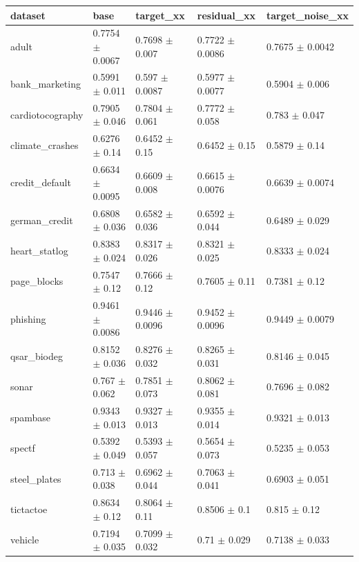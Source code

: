 \begin{tabular}{lllll}
\toprule
dataset & base & target\_xx & residual\_xx & target\_noise\_xx \\
\midrule
adult & 0.7754 $\pm$ 0.0067 & 0.7698 $\pm$ 0.007 & 0.7722 $\pm$ 0.0086 & 0.7675 $\pm$ 0.0042 \\
bank\_marketing & 0.5991 $\pm$ 0.011 & 0.597 $\pm$ 0.0087 & 0.5977 $\pm$ 0.0077 & 0.5904 $\pm$ 0.006 \\
cardiotocography & 0.7905 $\pm$ 0.046 & 0.7804 $\pm$ 0.061 & 0.7772 $\pm$ 0.058 & 0.783 $\pm$ 0.047 \\
climate\_crashes & 0.6276 $\pm$ 0.14 & 0.6452 $\pm$ 0.15 & 0.6452 $\pm$ 0.15 & 0.5879 $\pm$ 0.14 \\
credit\_default & 0.6634 $\pm$ 0.0095 & 0.6609 $\pm$ 0.008 & 0.6615 $\pm$ 0.0076 & 0.6639 $\pm$ 0.0074 \\
german\_credit & 0.6808 $\pm$ 0.036 & 0.6582 $\pm$ 0.036 & 0.6592 $\pm$ 0.044 & 0.6489 $\pm$ 0.029 \\
heart\_statlog & 0.8383 $\pm$ 0.024 & 0.8317 $\pm$ 0.026 & 0.8321 $\pm$ 0.025 & 0.8333 $\pm$ 0.024 \\
page\_blocks & 0.7547 $\pm$ 0.12 & 0.7666 $\pm$ 0.12 & 0.7605 $\pm$ 0.11 & 0.7381 $\pm$ 0.12 \\
phishing & 0.9461 $\pm$ 0.0086 & 0.9446 $\pm$ 0.0096 & 0.9452 $\pm$ 0.0096 & 0.9449 $\pm$ 0.0079 \\
qsar\_biodeg & 0.8152 $\pm$ 0.036 & 0.8276 $\pm$ 0.032 & 0.8265 $\pm$ 0.031 & 0.8146 $\pm$ 0.045 \\
sonar & 0.767 $\pm$ 0.062 & 0.7851 $\pm$ 0.073 & 0.8062 $\pm$ 0.081 & 0.7696 $\pm$ 0.082 \\
spambase & 0.9343 $\pm$ 0.013 & 0.9327 $\pm$ 0.013 & 0.9355 $\pm$ 0.014 & 0.9321 $\pm$ 0.013 \\
spectf & 0.5392 $\pm$ 0.049 & 0.5393 $\pm$ 0.057 & 0.5654 $\pm$ 0.073 & 0.5235 $\pm$ 0.053 \\
steel\_plates & 0.713 $\pm$ 0.038 & 0.6962 $\pm$ 0.044 & 0.7063 $\pm$ 0.041 & 0.6903 $\pm$ 0.051 \\
tictactoe & 0.8634 $\pm$ 0.12 & 0.8064 $\pm$ 0.11 & 0.8506 $\pm$ 0.1 & 0.815 $\pm$ 0.12 \\
vehicle & 0.7194 $\pm$ 0.035 & 0.7099 $\pm$ 0.032 & 0.71 $\pm$ 0.029 & 0.7138 $\pm$ 0.033 \\
\bottomrule
\end{tabular}
